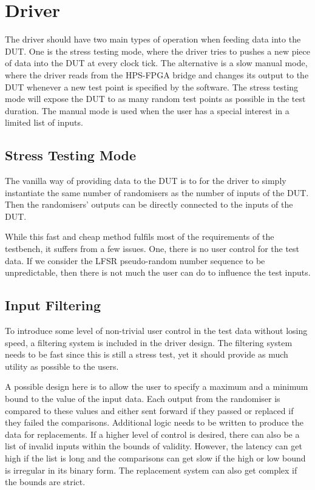 \section{Driver}

The driver should have two main types of operation when feeding data into the DUT.
One is the stress testing mode, where the driver tries to pushes a new piece of data into the DUT at every clock tick.
The alternative is a slow manual mode, where the driver reads from the HPS-FPGA bridge and changes its output to the DUT whenever a new test point is specified by the software.
The stress testing mode will expose the DUT to as many random test points as possible in the test duration.
The manual mode is used when the user has a special interest in a limited list of inputs.

\subsection{Stress Testing Mode}
The vanilla way of providing data to the DUT is to for the driver to simply instantiate the same number of randomisers as the number of inputs of the DUT.
Then the randomisers' outputs can be directly connected to the inputs of the DUT.

While this fast and cheap method fulfils most of the requirements of the testbench, it suffers from a few issues.
One, there is no user control for the test data.
If we consider the LFSR pseudo-random number sequence to be unpredictable, then there is not much the user can do to influence the test inputs.

\subsection{Input Filtering}
To introduce some level of non-trivial user control in the test data without losing speed, a filtering system is included in the driver design.
The filtering system needs to be fast since this is still a stress test, yet it should provide as much utility as possible to the users.

A possible design here is to allow the user to specify a maximum and a minimum bound to the value of the input data.
Each output from the randomiser is compared to these values and either sent forward if they passed or replaced if they failed the comparisons.
Additional logic needs to be written to produce the data for replacements.
If a higher level of control is desired, there can also be a list of invalid inputs within the bounds of validity.
However, the latency can get high if the list is long and the comparisons can get slow if the high or low bound is irregular in its binary form.
The replacement system can also get complex if the bounds are strict.

